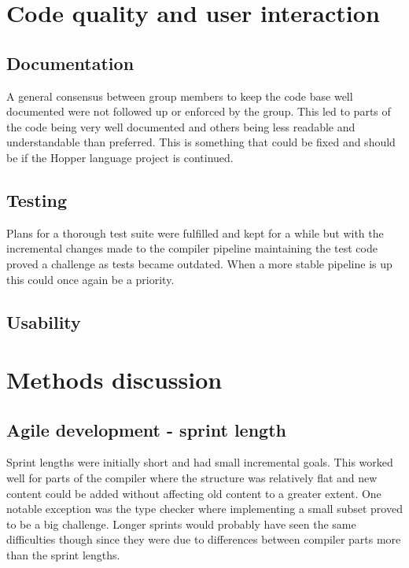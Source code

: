 \section{Code quality and user interaction}


\subsection{Documentation}

A general consensus between group members to keep the code base well documented were not followed up or enforced by the group. This led to parts of the code being very well documented and others being less readable and understandable than preferred. This is something that could be fixed and should be if the Hopper language project is continued.

\subsection{Testing}

Plans for a thorough test suite were fulfilled and kept for a while but with the incremental changes made to the compiler pipeline maintaining the test code proved a challenge as tests became outdated. When a more stable pipeline is up this could once again be a priority.

\subsection{Usability}

    

\section{Methods discussion}

\subsection{Agile development - sprint length}

Sprint lengths were initially short and had small incremental goals. This worked well for parts of the compiler where the structure was relatively flat and new content could be added without affecting old content to a greater extent. One notable exception was the type checker where implementing a small subset proved to be a big challenge. Longer sprints would probably have seen the same difficulties though since they were due to differences between compiler parts more than the sprint lengths.

